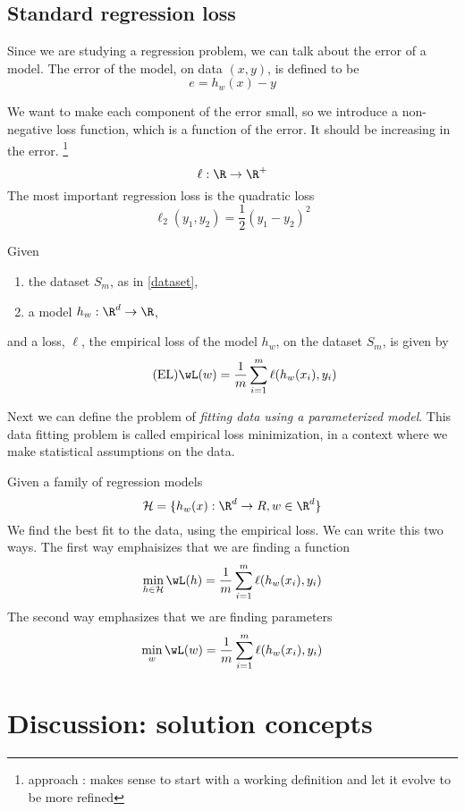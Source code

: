 \documentclass[12pt]{amsart}
\begin{document}
\subsection{Standard regression loss}
Since we are studying a regression problem, we can talk about the error of a model.
 The error of the model, on data  $(x, y)$, is defined to be 
\begin{equation}\label{error_regression}
e = h_w(x)-y	
\end{equation}

We want to make each component of the error small, so we introduce a non-negative loss function, which is a function of the error.   It should be increasing in the error. 
\footnote{approach : makes sense to start with a working definition and let it evolve to be more refined}
\[
\ell: \R \to \R^+
\]
The most important regression loss is the quadratic loss 	
\[
\ell_2(y_1, y_2) = \frac 1 2 (y_1-y_2)^2 
\]	


\begin{definition} Given 
\begin{enumerate}
	\item the dataset $S_m$, as in \eqref{dataset}, 
	\item a model $h_w: \R^d \to \R$,
\end{enumerate}
and a loss, $\ell$, 
the empirical loss of the model $h_w$, on the dataset $S_m$, is given by
\begin{equation}\tag{EL}\label{EL}
	\wL(w) = \frac{1}{m} \sum_{i=1}^m \ell(h_w(x_i), y_i)
\end{equation}
\end{definition}


Next we can define the problem of \emph{fitting data using a parameterized model}.  This data fitting problem is called empirical loss minimization, in a context where we make statistical assumptions on the data. 

Given a family of regression models 
\[
\mathcal H = \{ h_w(x) : \R^d \to R, w \in \R^d \}
\]
We find the best fit to the data, using the empirical loss.  We can write this two ways.  The first way emphaisizes that we are finding a function
\[
\min_{h \in \mathcal H} \wL(h) = \frac{1}{m} \sum_{i=1}^m \ell(h_w(x_i), y_i)
\]
The second way emphasizes that we are finding parameters 
\[
\min_{w} \wL(w) = \frac{1}{m} \sum_{i=1}^m \ell(h_w(x_i), y_i)
\]


\section{Discussion: solution concepts}
\end{document}
